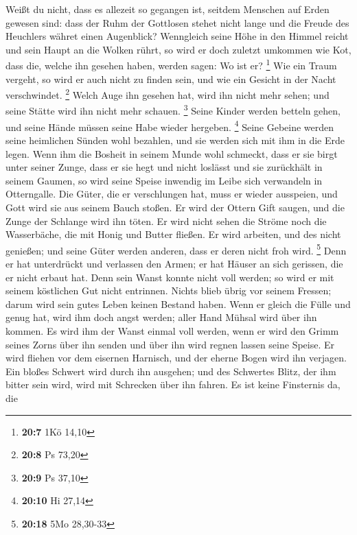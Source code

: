  Weißt du nicht, dass es allezeit so gegangen ist, seitdem
Menschen auf Erden gewesen sind:  dass der Ruhm der
Gottlosen stehet nicht lange und die Freude des Heuchlers währet einen
Augenblick?  Wenngleich seine Höhe in den Himmel reicht und
sein Haupt an die Wolken rührt,  so wird er doch zuletzt
umkommen wie Kot, dass die, welche ihn gesehen haben, werden sagen: Wo
ist er? \footnote{\textbf{20:7} 1Kö 14,10}  Wie ein Traum
vergeht, so wird er auch nicht zu finden sein, und wie ein Gesicht in
der Nacht verschwindet. \footnote{\textbf{20:8} Ps 73,20} 
Welch Auge ihn gesehen hat, wird ihn nicht mehr sehen; und seine Stätte
wird ihn nicht mehr schauen. \footnote{\textbf{20:9} Ps 37,10}
 Seine Kinder werden betteln gehen, und seine Hände müssen
seine Habe wieder hergeben. \footnote{\textbf{20:10} Hi 27,14}
 Seine Gebeine werden seine heimlichen Sünden wohl
bezahlen, und sie werden sich mit ihm in die Erde legen. 
Wenn ihm die Bosheit in seinem Munde wohl schmeckt, dass er sie birgt
unter seiner Zunge,  dass er sie hegt und nicht loslässt
und sie zurückhält in seinem Gaumen,  so wird seine Speise
inwendig im Leibe sich verwandeln in Otterngalle.  Die
Güter, die er verschlungen hat, muss er wieder ausspeien, und Gott wird
sie aus seinem Bauch stoßen.  Er wird der Ottern Gift
saugen, und die Zunge der Schlange wird ihn töten.  Er wird
nicht sehen die Ströme noch die Wasserbäche, die mit Honig und Butter
fließen.  Er wird arbeiten, und des nicht genießen; und
seine Güter werden anderen, dass er deren nicht froh wird. \footnote{\textbf{20:18}
  5Mo 28,30-33}  Denn er hat unterdrückt und verlassen den
Armen; er hat Häuser an sich gerissen, die er nicht erbaut hat.
 Denn sein Wanst konnte nicht voll werden; so wird er mit
seinem köstlichen Gut nicht entrinnen.  Nichts blieb übrig
vor seinem Fressen; darum wird sein gutes Leben keinen Bestand haben.
 Wenn er gleich die Fülle und genug hat, wird ihm doch
angst werden; aller Hand Mühsal wird über ihn kommen.  Es
wird ihm der Wanst einmal voll werden, wenn er wird den Grimm seines
Zorns über ihn senden und über ihn wird regnen lassen seine Speise.
 Er wird fliehen vor dem eisernen Harnisch, und der eherne
Bogen wird ihn verjagen.  Ein bloßes Schwert wird durch ihn
ausgehen; und des Schwertes Blitz, der ihm bitter sein wird, wird mit
Schrecken über ihn fahren.  Es ist keine Finsternis da, die
